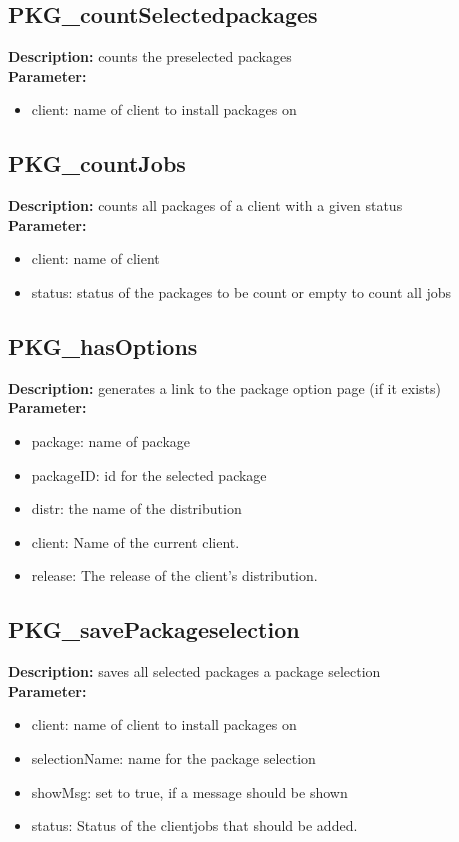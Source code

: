 \subsection{PKG\_countSelectedpackages}
\textbf{Description:} counts the preselected packages\\
\textbf{Parameter:}
\begin{itemize}
\item client: name of client to install packages on
\end{itemize}

\subsection{PKG\_countJobs}
\textbf{Description:} counts all packages of a client with a given status\\
\textbf{Parameter:}
\begin{itemize}
\item client: name of client
\item status: status of the packages to be count or empty to count all jobs
\end{itemize}

\subsection{PKG\_hasOptions}
\textbf{Description:} generates a link to the package option page (if it exists)\\
\textbf{Parameter:}
\begin{itemize}
\item package: name of package
\item packageID: id for the selected package
\item distr: the name of the distribution
\item client: Name of the current client.
\item release: The release of the client's distribution.
\end{itemize}

\subsection{PKG\_savePackageselection}
\textbf{Description:} saves all selected packages a package selection\\
\textbf{Parameter:}
\begin{itemize}
\item client: name of client to install packages on
\item selectionName: name for the package selection
\item showMsg: set to true, if a message should be shown
\item status: Status of the clientjobs that should be added.
\end{itemize}

